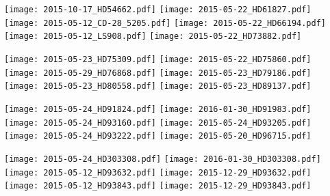 \documentclass[a4paper]{aa}
\begin{document}
\noindent
  \texttt{[image: 2015-10-17\_HD54662.pdf]}
  \texttt{[image: 2015-05-22\_HD61827.pdf]}\\
  \texttt{[image: 2015-05-12\_CD-28\_5205.pdf]}
  \texttt{[image: 2015-05-22\_HD66194.pdf]}\\
  \texttt{[image: 2015-05-12\_LS908.pdf]}
  \texttt{[image: 2015-05-22\_HD73882.pdf]}
\newpage

\noindent
  \texttt{[image: 2015-05-23\_HD75309.pdf]}
  \texttt{[image: 2015-05-22\_HD75860.pdf]}\\
  \texttt{[image: 2015-05-29\_HD76868.pdf]}
  \texttt{[image: 2015-05-23\_HD79186.pdf]}\\
  \texttt{[image: 2015-05-23\_HD80558.pdf]}
  \texttt{[image: 2015-05-23\_HD89137.pdf]}
\newpage

\noindent
  \texttt{[image: 2015-05-24\_HD91824.pdf]}
  \texttt{[image: 2016-01-30\_HD91983.pdf]}\\
  \texttt{[image: 2015-05-24\_HD93160.pdf]}
  \texttt{[image: 2015-05-24\_HD93205.pdf]}\\
  \texttt{[image: 2015-05-24\_HD93222.pdf]}
  \texttt{[image: 2015-05-20\_HD96715.pdf]}\\
\newpage

\noindent
  \texttt{[image: 2015-05-24\_HD303308.pdf]}
  \texttt{[image: 2016-01-30\_HD303308.pdf]}\\
  \texttt{[image: 2015-05-12\_HD93632.pdf]}
  \texttt{[image: 2015-12-29\_HD93632.pdf]}\\
  \texttt{[image: 2015-05-12\_HD93843.pdf]}
  \texttt{[image: 2015-12-29\_HD93843.pdf]}
\newpage
\end{document}
